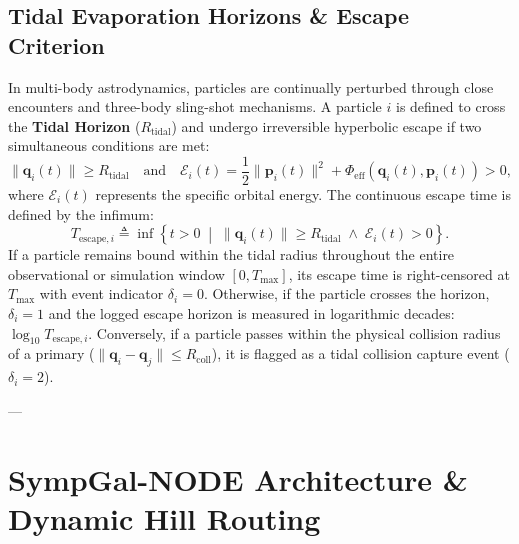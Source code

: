 \documentclass[preprint,12pt,3p]{elsarticle}
\begin{document}
\subsection{Tidal Evaporation Horizons \& Escape Criterion}
In multi-body astrodynamics, particles are continually perturbed through close encounters and three-body sling-shot mechanisms. A particle $i$ is defined to cross the \textbf{Tidal Horizon} ($R_{\mathrm{tidal}}$) and undergo irreversible hyperbolic escape if two simultaneous conditions are met:
\begin{equation}
\|\bm{q}_i(t)\| \ge R_{\mathrm{tidal}} \quad \text{and} \quad \mathcal{E}_i(t) = \frac{1}{2}\|\bm{p}_i(t)\|^2 + \Phi_{\mathrm{eff}}(\bm{q}_i(t), \bm{p}_i(t)) > 0,
\label{eq:escape_criterion}
\end{equation}
where $\mathcal{E}_i(t)$ represents the specific orbital energy. The continuous escape time is defined by the infimum:
\begin{equation}
T_{\mathrm{escape}, i} \triangleq \inf \left\{ t > 0 \;\middle|\; \|\bm{q}_i(t)\| \ge R_{\mathrm{tidal}} \;\wedge\; \mathcal{E}_i(t) > 0 \right\}.
\label{eq:infimum_escape}
\end{equation}
If a particle remains bound within the tidal radius throughout the entire observational or simulation window $[0, T_{\max}]$, its escape time is right-censored at $T_{\max}$ with event indicator $\delta_i = 0$. Otherwise, if the particle crosses the horizon, $\delta_i = 1$ and the logged escape horizon is measured in logarithmic decades: $\log_{10} T_{\mathrm{escape}, i}$. Conversely, if a particle passes within the physical collision radius of a primary ($\|\bm{q}_i - \bm{q}_j\| \le R_{\mathrm{coll}}$), it is flagged as a tidal collision capture event ($\delta_i = 2$).

---

\section{SympGal-NODE Architecture \& Dynamic Hill Routing}\label{sec:architecture}
\end{document}
